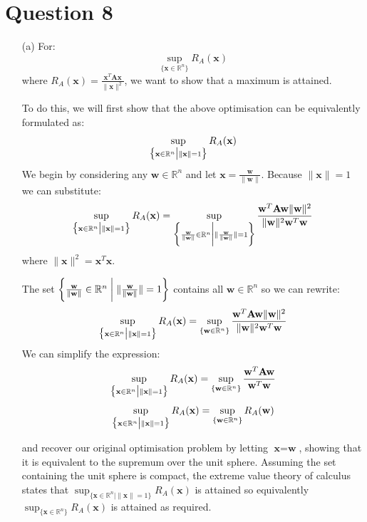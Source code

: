 \documentclass[12pt]{article}
\begin{document}
\newpage
\section*{Question 8}
\begin{enumerate}
\item[(a)] For:
$$\sup_{\{\textbf{x}\in \mathbb{R}^n\}} R_A(\textbf{x})$$
where $R_A(\textbf{x}) = \frac{\textbf{x}^T\textbf{Ax}}{\|\textbf{x}\|^2}$, we want to show that a maximum is attained.

To do this, we will first show that the above optimisation can be equivalently formulated as:
$$\sup_{\big\{\textbf{x}\in \mathbb{R}^n \bigm| \| \textbf{x}\|=1\big\}} R_A(\textbf{x})$$
We begin by considering any $\textbf{w} \in \mathbb{R}^n$ and let $\textbf{x} = \frac{\textbf{w}}{\|\textbf{w}\|}$. Because $\|\textbf{x}\| = 1$ we can substitute:
$$\sup_{\big\{\textbf{x}\in \mathbb{R}^n \bigm| \| \textbf{x}\|=1\big\}} R_A(\textbf{x}) = \sup_{\bigg\{\frac{\textbf{w}}{\|\textbf{w}\|}\in \mathbb{R}^n \biggm| \| \frac{\textbf{w}}{\|\textbf{w}\|}\|=1\bigg\}} \frac{\textbf{w}^T\textbf{Aw} \|\textbf{w}\|^2}{\|\textbf{w}\|^2 \textbf{w}^T\textbf{w}}$$
where $\|\textbf{x}\|^2 = \textbf{x}^T\textbf{x}$.

The set $\bigg\{\frac{\textbf{w}}{\|\textbf{w}\|}\in \mathbb{R}^n \biggm| \| \frac{\textbf{w}}{\|\textbf{w}\|}\|=1\bigg\}$ contains all $\textbf{w} \in \mathbb{R}^n$ so we can rewrite:
$$\sup_{\big\{\textbf{x}\in \mathbb{R}^n \bigm| \| \textbf{x}\|=1\big\}} R_A(\textbf{x})=\sup_{\{\textbf{w}\in \mathbb{R}^n\}} \frac{\textbf{w}^T\textbf{Aw} \|\textbf{w}\|^2}{\|\textbf{w}\|^2 \textbf{w}^T\textbf{w}}$$
We can simplify the expression:
$$\sup_{\big\{\textbf{x}\in \mathbb{R}^n \bigm| \| \textbf{x}\|=1\big\}} R_A(\textbf{x})=\sup_{\{\textbf{w}\in \mathbb{R}^n\}} \frac{\textbf{w}^T\textbf{Aw} }{\textbf{w}^T\textbf{w}}$$
$$\sup_{\big\{\textbf{x}\in \mathbb{R}^n \bigm| \| \textbf{x}\|=1\big\}} R_A(\textbf{x})=\sup_{\{\textbf{w}\in \mathbb{R}^n\}} R_A(\textbf{w})$$

and recover our original optimisation problem by letting $\textbf{x}=\textbf{w}$, showing that it is equivalent to the supremum over the unit sphere. Assuming the set containing the unit sphere is compact, the extreme value theory of calculus states that $\sup_{\{\textbf{x}\in \mathbb{R}^n | \| \textbf{x}\|=1\}} R_A(\textbf{x})$ is attained so equivalently $\sup_{\{\textbf{x}\in \mathbb{R}^n\}} R_A(\textbf{x})$ is attained as required.


\end{enumerate}
\end{document}
